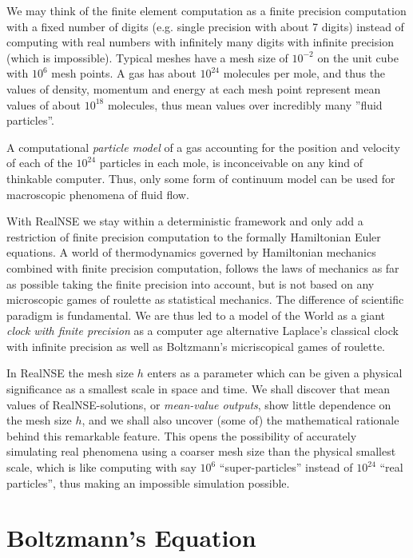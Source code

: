 We may think of the finite
element computation as a finite precision computation with a 
fixed number of digits
(e.g. single precision with about 7 digits) instead of 
computing with real numbers with infinitely many digits with
infinite precision (which is impossible).
 Typical meshes have a mesh size
of $10^{-2}$ on the unit cube with $10^6$ mesh points. A gas 
has about $10^{24}$ molecules per mole, and thus the values of
density, momentum and energy at each mesh point represent mean values
of about $10^{18}$ molecules, thus mean values over incredibly
many ''fluid particles''. 

A computational \emph{particle model} of a gas 
accounting for the position and velocity of each
of the $10^{24}$ particles in each mole, is 
inconceivable on any kind of thinkable computer. Thus, only 
some form of continuum
model can be used for macroscopic phenomena of fluid flow.

With RealNSE we stay within a deterministic 
framework and only add a restriction of finite precision computation
to the formally Hamiltonian Euler equations.
A world of thermodynamics governed by Hamiltonian mechanics 
combined with finite
precision computation, 
follows the laws of mechanics
as far as possible taking the finite precision into account,
but is not based on any microscopic games of roulette as  
statistical mechanics. The difference of scientific paradigm 
is fundamental. We are thus led  to a model of the 
World as a giant \emph{clock with finite precision}
as a computer age  alternative Laplace's classical clock 
with infinite precision as well as Boltzmann's 
micriscopical games of roulette.


In RealNSE the mesh size $h$ enters as a parameter which can be given
a physical significance as a smallest scale in space and time. We 
shall discover that mean values of 
RealNSE-solutions, or \emph{mean-value outputs}, 
show little dependence on the mesh size $h$, and we
shall also uncover (some of) the mathematical rationale behind this 
remarkable feature. 
This opens the possibility of accurately simulating 
real phenomena using a coarser mesh size than the physical smallest scale,
which is like computing with say $10^6$ ``super-particles'' 
instead of $10^{24}$ ``real particles'', thus making an impossible simulation
possible.

\section{Boltzmann's Equation}

